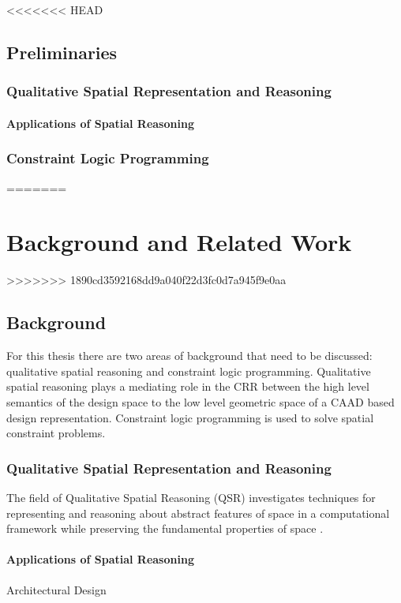 \documentclass[12pt]{ucthesis}
\begin{document}
<<<<<<< HEAD
\section{Preliminaries}
\label{preliminaries}

\subsection{Qualitative Spatial Representation and Reasoning}
\subsubsection{Applications of Spatial Reasoning}
\subsection{Constraint Logic Programming}
=======

\chapter{Background and Related Work} 
>>>>>>> 1890cd3592168dd9a040f22d3fc0d7a945f9e0aa


\section{Background}
\label{background}
For this thesis there are two areas of background that need to be discussed: qualitative spatial reasoning and constraint logic programming. Qualitative spatial reasoning plays a mediating role in the CRR between the high level semantics of the design space to the low level geometric space of a CAAD based design representation. Constraint logic programming is used to solve spatial constraint problems.

\subsection{Qualitative Spatial Representation and Reasoning}
The field of Qualitative Spatial Reasoning (QSR) investigates techniques for representing and reasoning about abstract features of space in a computational framework while preserving the fundamental properties of space \cite{freksa1991qsr} \cite{bhattSpatialComputing}.

\subsubsection{Applications of Spatial Reasoning}
Architectural Design \cite{bhattSpatialComputing}
\end{document}
